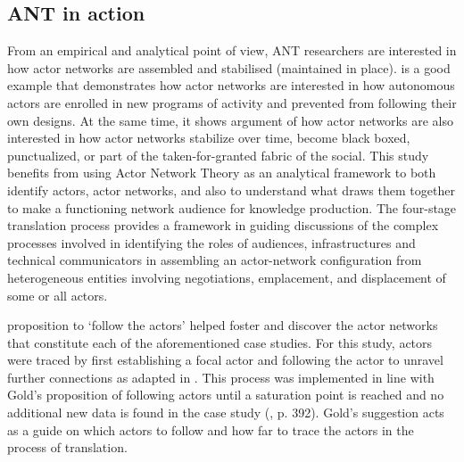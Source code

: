 \subsection{ANT in action}
From an empirical and analytical point of view, ANT researchers are interested in how actor networks are assembled and stabilised (maintained in place). \textcite{callon1986sociology} is a good example that demonstrates how actor networks are interested in how autonomous actors are enrolled in new programs of activity and prevented from following their own designs. At the same time, it shows \textcite{law1992notes} argument of how actor networks are also interested in how actor networks stabilize over time, become black boxed, punctualized, or part of the taken-for-granted fabric of the social. This study benefits from using Actor Network Theory as an analytical framework to both identify actors, actor networks, and also to understand what draws them together to make a functioning network audience for knowledge production. The four-stage translation process \cite{callon1986sociology} provides a framework in guiding discussions of the complex processes involved in identifying the roles of audiences, infrastructures and technical communicators in assembling an actor-network configuration from heterogeneous entities involving negotiations, emplacement, and displacement of some or all actors.

\textcite{callon1986sociology} proposition to ‘follow the actors’ helped foster and discover the actor networks that constitute each of the aforementioned case studies. For this study, actors were traced by first establishing a focal actor and following the actor to unravel further connections as adapted in \textcite{callon1986sociology}. This process was implemented in line with Gold's proposition of following actors until a saturation point is reached and no additional new data is found in the case study (\cite{golds1997healthy}, p. 392). Gold’s suggestion acts as a guide on which actors to follow and how far to trace the actors in the process of translation.

